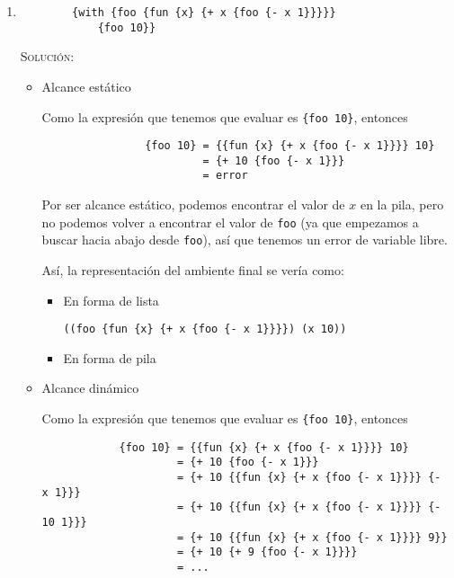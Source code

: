\documentclass[letterpaper,11pt]{article}
\begin{document}
\begin{enumerate}
\begin{enumerate}
        \item 
        \begin{verbatim}
        {with {foo {fun {x} {+ x {foo {- x 1}}}}} 
            {foo 10}}
        \end{verbatim}
        
        \textsc{Solución:}
        \begin{itemize}
            \item Alcance estático 
            
            Como la expresión que tenemos que evaluar es \texttt{\{foo 10\}}, 
            entonces
            \begin{verbatim}
                {foo 10} = {{fun {x} {+ x {foo {- x 1}}}} 10}
                         = {+ 10 {foo {- x 1}}}
                         = error 
            \end{verbatim}

            Por ser alcance estático, podemos encontrar el valor de $x$ en la 
            pila, pero no podemos volver a encontrar el valor de \texttt{foo}
            (ya que empezamos a buscar hacia abajo desde \texttt{foo}), así que 
            tenemos un error de variable libre.

            Así, la representación del ambiente final se vería como:
            \begin{itemize}
                \item En forma de lista
                \begin{center}
                    \texttt{((foo \{fun \{x\} \{+ x \{foo \{- x 1\}\}\}\}) (x 10))}
                \end{center}

                \newpage
                \item En forma de pila 
                \begin{center}
                \begin{drawstack}[scale=1.78]
                \end{drawstack}
                \end{center}
            \end{itemize}

            \item Alcance dinámico
            
            Como la expresión que tenemos que evaluar es \texttt{\{foo 10\}}, 
            entonces
            \begin{verbatim}
            {foo 10} = {{fun {x} {+ x {foo {- x 1}}}} 10}
                     = {+ 10 {foo {- x 1}}}
                     = {+ 10 {{fun {x} {+ x {foo {- x 1}}}} {- x 1}}}
                     = {+ 10 {{fun {x} {+ x {foo {- x 1}}}} {- 10 1}}}
                     = {+ 10 {{fun {x} {+ x {foo {- x 1}}}} 9}}
                     = {+ 10 {+ 9 {foo {- x 1}}}}
                     = ...
            \end{verbatim}


\end{itemize}
\end{enumerate}
\end{enumerate}
\end{document}
